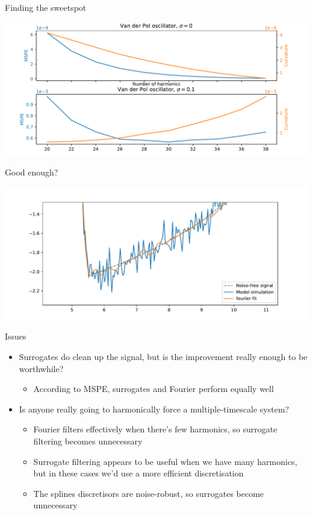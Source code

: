 \documentclass[presentation]{beamer}
\begin{document}
\begin{frame}[label={sec:org227842d}]{Finding the sweetspot}
\begin{center}
\includegraphics[width=.9\linewidth]{./sweetspot1.pdf}
\end{center}
\end{frame}

\begin{frame}[label={sec:orgbd3270e}]{Good enough?}
\begin{center}
\includegraphics[width=.9\linewidth]{./fourier_sweetspot.pdf}
\end{center}
\end{frame}

\begin{frame}[label={sec:org4fd1b21}]{Issues}
\begin{itemize}
\item Surrogates do clean up the signal, but is the improvement really enough to be worthwhile?
\begin{itemize}
\item \alert{According to MSPE, surrogates and Fourier perform equally well}
\end{itemize}
\end{itemize}
\vfill
\begin{itemize}
\item Is anyone really going to harmonically force a multiple-timescale system?
\begin{itemize}
\item Fourier filters effectively when there's few harmonics, so surrogate filtering becomes unnecessary
\item Surrogate filtering appears to be useful when we have many harmonics, but in these cases we'd use a more efficient discretisation
\item The splines discretisors are noise-robust, so surrogates become unnecessary
\end{itemize}
\end{itemize}
\end{frame}
\end{document}
